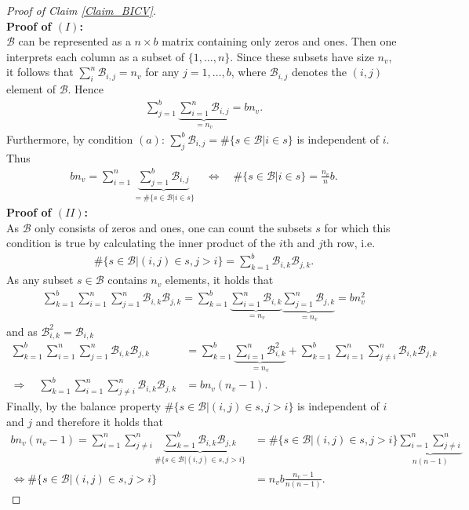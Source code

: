 \documentclass[Research_Module_ES.tex]{subfiles}
\begin{document}
\begin{proof}[Proof of Claim \ref{Claim_BICV}]~\\
	\textbf{Proof of $(I)$:}\\
	$\mathcal{B}$ can be represented as a $n\times b$ matrix containing only zeros and ones. Then one interprets each column as a subset of $\{ 1,\dots,n\}$. Since these subsets have size $n_v$, it follows that $\sum_i^n \mathcal{B}_{i,j}=n_v$ for any $j= 1, \dots ,b$, where $\mathcal{B}_{i,j}$ denotes the $(i,j)$ element of $\mathcal{B}$. Hence
	\begin{align*}
	\sum_{j=1}^b\underbrace{\sum_{i=1}^n \mathcal{B}_{i,j}}_{=n_v} = bn_v.
	\end{align*}
	Furthermore, by condition $(a)$: $\sum_j^b \mathcal{B}_{i,j} = \#\{s\in \mathcal{B}| i\in s\}$ is independent of $i$. Thus 
	\begin{align*}
	bn_v = \sum_{i=1}^n\underbrace{\sum_{j=1}^b \mathcal{B}_{i,j}}_{=\#\{s\in \mathcal{B}| i\in s\}} \quad
	\iff \quad \#\{s\in \mathcal{B}| i\in s\} = \frac{n_v}{n}b. 
	\end{align*} 
	\textbf{Proof of $(II)$:}\\
	As $\mathcal{B}$ only consists of zeros and ones, one can count the subsets $s$ for which this condition is true by calculating the inner product of the $i$th and $j$th row, i.e.
	\begin{align*}
	\#\{s\in\mathcal{B}|(i,j)\in s, j>i\} = \sum_{k=1}^b\mathcal{B}_{i,k}\mathcal{B}_{j,k}.
	\end{align*}
	As any subset $s \in \mathcal{B}$ contains $n_v$ elements, it holds that
	\begin{align*}
	\sum_{k=1}^b\sum_{i=1}^n\sum_{j=1}^n\mathcal{B}_{i,k}\mathcal{B}_{j,k}= \sum_{k=1}^b\underbrace{\sum_{i=1}^n\mathcal{B}_{i,k}}_{=n_v}\underbrace{\sum_{j=1}^n\mathcal{B}_{j,k}}_{=n_v}=bn_v^2
	\end{align*}
	and as $\mathcal{B}_{i,k}^2=\mathcal{B}_{i,k}$
	\begin{align*}
	\sum_{k=1}^b\sum_{i=1}^n\sum_{j=1}^n\mathcal{B}_{i,k}\mathcal{B}_{j,k} &= \sum_{k=1}^b\underbrace{\sum_{i=1}^n\mathcal{B}_{i,k}^2}_{=n_v} +\sum_{k=1}^b\sum_{i=1}^n\sum_{j\neq i}^n\mathcal{B}_{i,k}\mathcal{B}_{j,k}\\
	\Rightarrow \quad \sum_{k=1}^b\sum_{i=1}^n\sum_{j\neq i}^n\mathcal{B}_{i,k}\mathcal{B}_{j,k} &= bn_v(n_v-1).
	\end{align*}
	Finally, by the balance property $\#\{s\in\mathcal{B}|(i,j)\in s, j>i\}$ is independent of $i$ and $j$ and therefore it holds that
	\begin{align*}
	bn_v(n_v-1) = \sum_{i=1}^n\sum_{j\neq i}^n\underbrace{\sum_{k=1}^b\mathcal{B}_{i,k}\mathcal{B}_{j,k}}_{\#\{s\in\mathcal{B}|(i,j)\in s, j>i\}}&=\#\{s\in\mathcal{B}|(i,j)\in s, j>i\}\underbrace{\sum_{i=1}^n\sum_{j\neq i}^n}_{n(n-1)}\\
	\iff \#\{s\in\mathcal{B}|(i,j)\in s, j>i\}&=n_vb\frac{n_v-1}{n(n-1)}.
	\end{align*}
\end{proof} 
\end{document}
